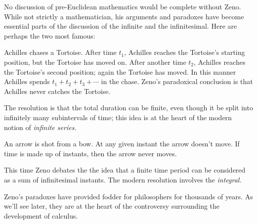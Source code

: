 No discussion of pre-Euclidean mathematics would be complete without Zeno. While not strictly a mathematician, his arguments and paradoxes have become essential parts of the discussion of the infinite and the infinitesimal. Here are perhaps the two most famous:
\begin{description}\itemsep0pt
  \item[\normalfont\emph{Achilles and Tortoise}] Achilles chases a Tortoise. After time $t_1$, Achilles reaches the Tortoise's starting position, but the Tortoise has moved on. After another time $t_2$, Achilles reaches the Tortoise's second position; again the Tortoise has moved. In this manner Achilles spends $t_1+t_2+t_3+\cdots$ in the chase. Zeno's paradoxical conclusion is that Achilles never catches the Tortoise.\par
  The resolution is that the total duration can be finite, even though it be split into infinitely many subintervals of time; this idea is at the heart of the modern notion of \emph{infinite series.}
  \item[\normalfont\emph{Arrow paradox}] An arrow is shot from a bow. At any given instant the arrow doesn't move. If time is made up of instants, then the arrow never moves.\par
  This time Zeno debates the the idea that a finite time period can be considered as a sum of infinitesimal instants. The modern resolution involves the \emph{integral.}
\end{description}

Zeno's paradoxes have provided fodder for philosophers for thousands of years. As we'll see later, they are at the heart of the controversy surrounding the development of calculus.%


\label{pg:construction}

